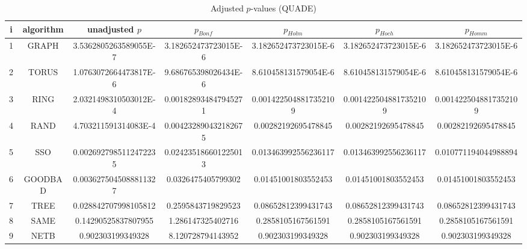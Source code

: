 \documentclass[a4paper,10pt]{article}
\begin{document}
\begin{landscape}
\begin{table}[!htp]
\centering\scriptsize
\caption{Adjusted $p$-values (QUADE)}
\begin{tabular}{ccccccc}
i&algorithm&unadjusted $p$&$p_{Bonf}$&$p_{Holm}$&$p_{Hoch}$&$p_{Homm}$\\
\hline
1& GRAPH&3.5362805263589055E-7&3.182652473723015E-6&3.182652473723015E-6&3.182652473723015E-6&3.182652473723015E-6\\
2& TORUS&1.0763072664473817E-6&9.686765398026434E-6&8.610458131579054E-6&8.610458131579054E-6&8.610458131579054E-6\\
3& RING&2.0321498310503012E-4&0.001828934847945271&0.0014225048817352109&0.0014225048817352109&0.0014225048817352109\\
4& RAND&4.703211591314083E-4&0.004232890432182675&0.00282192695478845&0.00282192695478845&0.00282192695478845\\
5& SSO&0.0026927985112472235&0.024235186601225013&0.013463992556236117&0.013463992556236117&0.010771194044988894\\
6& GOODBAD&0.0036275045088811327&0.0326475405799302&0.01451001803552453&0.01451001803552453&0.01451001803552453\\
7& TREE&0.028842707998105812&0.2595843719829523&0.08652812399431743&0.08652812399431743&0.08652812399431743\\
8& SAME&0.14290525837807955&1.286147325402716&0.2858105167561591&0.2858105167561591&0.2858105167561591\\
9& NETB&0.902303199349328&8.120728794143952&0.902303199349328&0.902303199349328&0.902303199349328\\
\hline
\end{tabular}
\end{table}


\end{landscape}
\end{document}
